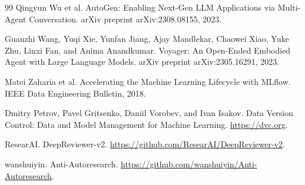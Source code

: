 \documentclass[11pt]{article}
\begin{document}
\begin{thebibliography}{99}
Qingyun Wu et al.
\newblock AutoGen: Enabling Next-Gen LLM Applications via Multi-Agent Conversation.
\newblock arXiv preprint arXiv:2308.08155, 2023.

Guanzhi Wang, Yuqi Xie, Yunfan Jiang, Ajay Mandlekar, Chaowei Xiao, Yuke Zhu, Linxi Fan, and Anima Anandkumar.
\newblock Voyager: An Open-Ended Embodied Agent with Large Language Models.
\newblock arXiv preprint arXiv:2305.16291, 2023.

Matei Zaharia et al.
\newblock Accelerating the Machine Learning Lifecycle with MLflow.
\newblock IEEE Data Engineering Bulletin, 2018.

Dmitry Petrov, Pavel Gritsenko, Daniil Vorobev, and Ivan Isakov.
\newblock Data Version Control: Data and Model Management for Machine Learning.
\newblock \url{https://dvc.org}.

ResearAI.
\newblock DeepReviewer-v2.
\newblock \url{https://github.com/ResearAI/DeepReviewer-v2}.

wanshuiyin.
\newblock Anti-Autoresearch.
\newblock \url{https://github.com/wanshuiyin/Anti-Autoresearch}.

\end{thebibliography}
\end{document}
